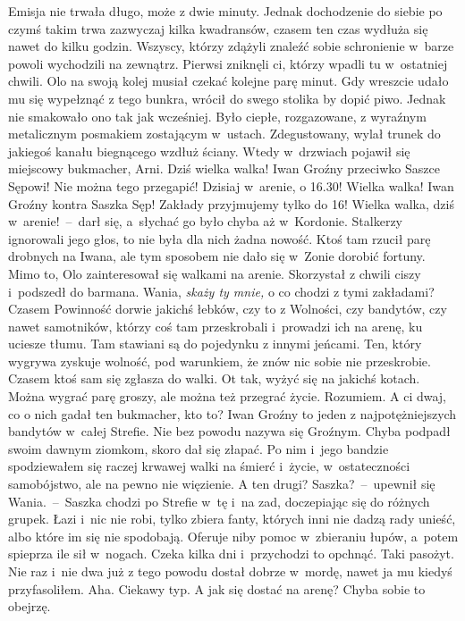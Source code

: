 \documentclass[../MAIN.tex]{subfiles}
\begin{document}
Emisja nie trwała długo, może z dwie minuty. Jednak dochodzenie do siebie po czymś takim trwa zazwyczaj kilka kwadransów, czasem ten czas wydłuża się nawet do kilku godzin. Wszyscy, którzy zdążyli znaleźć sobie schronienie w~barze powoli wychodzili na zewnątrz. Pierwsi zniknęli ci, którzy wpadli tu w~ostatniej chwili. Olo na swoją kolej musiał czekać kolejne parę minut. Gdy wreszcie udało mu się wypełznąć z tego bunkra, wrócił do swego stolika by dopić piwo. Jednak nie smakowało ono tak jak wcześniej. Było ciepłe, rozgazowane, z wyraźnym metalicznym posmakiem zostającym w~ustach. Zdegustowany, wylał trunek do jakiegoś kanału biegnącego wzdłuż ściany. Wtedy w~drzwiach pojawił się miejscowy bukmacher, Arni.
\sx Dziś wielka walka! Iwan Groźny przeciwko Saszce Sępowi! Nie można tego przegapić! Dzisiaj w~arenie, o 16.30! Wielka walka! Iwan Groźny kontra Saszka Sęp! Zakłady przyjmujemy tylko do 16! Wielka walka, dziś w~arenie!~--~darł się, a~słychać go było chyba aż w~Kordonie. Stalkerzy ignorowali jego głos, to nie była dla nich żadna nowość. Ktoś tam rzucił parę drobnych na Iwana, ale tym sposobem nie dało się w~Zonie dorobić fortuny.
\qm
Mimo to, Olo zainteresował się walkami na arenie. Skorzystał z chwili ciszy i~podszedł do barmana.
\sx Wania, \textit{skaży ty mnie,} o co chodzi z tymi zakładami?
\xx Czasem Powinność dorwie jakichś łebków, czy to z Wolności, czy bandytów, czy nawet samotników, którzy coś tam przeskrobali i~prowadzi ich na arenę, ku uciesze tłumu. Tam stawiani są do pojedynku z innymi jeńcami. Ten, który wygrywa zyskuje wolność, pod warunkiem, że znów nic sobie nie przeskrobie. Czasem ktoś sam się zgłasza do walki. Ot tak, wyżyć się na jakichś kotach. Można wygrać parę groszy, ale można też przegrać życie.
\xx Rozumiem. A ci dwaj, co o nich gadał ten bukmacher, kto to?
\xx Iwan Groźny to jeden z najpotężniejszych bandytów w~całej Strefie. Nie bez powodu nazywa się Groźnym. Chyba podpadł swoim dawnym ziomkom, skoro dał się złapać. Po nim i~jego bandzie spodziewałem się raczej krwawej walki na śmierć i~życie, w~ostateczności samobójstwo, ale na pewno nie więzienie.
\xx A ten drugi?
\xx Saszka?~--~upewnił się Wania.~--~Saszka chodzi po Strefie w~tę i~na zad, doczepiając się do różnych grupek. Łazi i~nic nie robi, tylko zbiera fanty, których inni nie dadzą rady unieść, albo które im się nie spodobają. Oferuje niby pomoc w~zbieraniu łupów, a~potem spieprza ile sił w~nogach. Czeka kilka dni i~przychodzi to opchnąć. Taki pasożyt. Nie raz i~nie dwa już z tego powodu dostał dobrze w~mordę, nawet ja mu kiedyś przyfasoliłem.
\xx Aha. Ciekawy typ. A jak się dostać na arenę? Chyba sobie to obejrzę.
\end{document}
